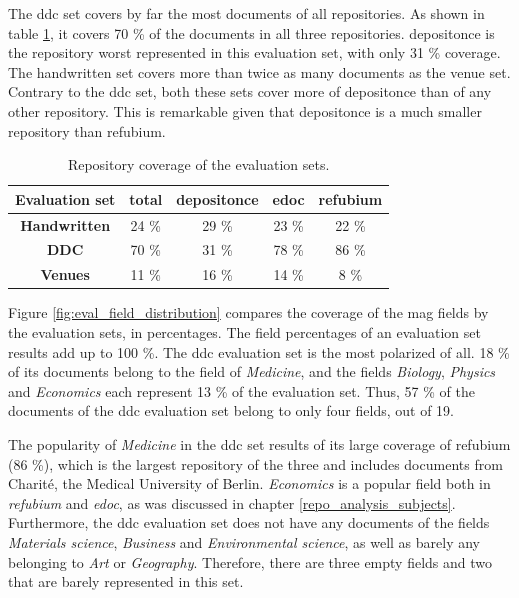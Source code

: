 The \acrshort{ddc} set covers by far the most documents of all repositories. As shown in table \ref{tab:eval_repo_coverage}, it covers 70 \% of the documents in all three repositories. depositonce is the repository worst represented in this evaluation set, with only 31 \% coverage. The handwritten set covers more than twice as many documents as the venue set. Contrary to the \acrshort{ddc} set, both these sets cover more of depositonce than of any other repository. This is remarkable given that depositonce is a much smaller repository than refubium.

\begin{table}[]
    \centering
    \begin{tabular}{|c|c|c|c|c|}
        \hline
        \textbf{Evaluation set} & \textbf{total} & \textbf{depositonce} & \textbf{edoc} & \textbf{refubium} \\ \hline \hline
        \textbf{Handwritten} & 24 \% & 29 \% & 23 \% & 22 \% \\ \hline
        \textbf{DDC} & 70 \% & 31 \% & 78 \% & 86 \% \\ \hline
        \textbf{Venues} & 11 \% & 16 \% & 14 \% & 8 \% \\ \hline
    \end{tabular}
    \caption{Repository coverage of the evaluation sets.}
    \label{tab:eval_repo_coverage}
\end{table}

Figure \ref{fig:eval_field_distribution} compares the coverage of the \acrshort{mag} fields by the evaluation sets, in percentages. The field percentages of an evaluation set results add up to 100 \%. The \acrshort{ddc} evaluation set is the most polarized of all. 18 \% of its documents belong to the field of \textit{Medicine}, and the fields \textit{Biology}, \textit{Physics} and \textit{Economics} each represent 13 \% of the evaluation set. Thus, 57 \% of the documents of the \acrshort{ddc} evaluation set belong to only four fields, out of 19.

The popularity of \textit{Medicine} in the \acrshort{ddc} set results of its large coverage of refubium (86 \%), which is the largest repository of the three and includes documents from Charité, the Medical University of Berlin. \textit{Economics} is a popular field both in \textit{refubium} and \textit{edoc}, as was discussed in chapter \ref{repo_analysis_subjects}. Furthermore, the \acrshort{ddc} evaluation set does not have any documents of the fields \textit{Materials science}, \textit{Business} and \textit{Environmental science}, as well as barely any belonging to \textit{Art} or \textit{Geography}. Therefore, there are three empty fields and two that are barely represented in this set.

